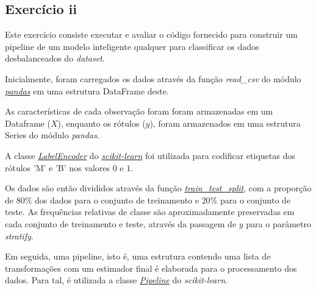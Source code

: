 

\subsection{Exercício ii}

Este exercício consiste executar e avaliar o código fornecido para construir um pipeline de um modelo inteligente qualquer para classificar os dados desbalanceados do \textit{dataset}.

Inicialmente, foram carregados os dados através da função \textit{read\_csv} do módulo \href{https://pandas.pydata.org/}{\textit{pandas}} em uma estrutura DataFrame deste.

As características de cada observação foram foram armazenadas em um Dataframe ($X$), enquanto os rótulos ($y$), foram armazenados em uma estrutura Series do módulo \textit{pandas}.

A classe \textit{\href{https://scikit-learn.org/stable/modules/generated/sklearn.preprocessing.LabelEncoder.html}{LabelEncoder}} do \href{https://scikit-learn.org/stable/index.html}{\textit{scikit-learn}} \citep{scikit-learn} foi utilizada para codificar etiquetas dos rótulos 'M' e 'B' nos valores $0$ e $1$.

Os dados são então divididos através da função \href{https://scikit-learn.org/stable/modules/generated/sklearn.model_selection.train_test_split.html}{\textit{train\_test\_split}}, com a proporção de $80\%$ dos dados para o conjunto de treinamento e $20\%$ para o conjunto de teste. As frequências relativas de classe são aproximadamente preservadas em cada conjunto de treinamento e teste, através da passagem de $y$ para o parâmetro \textit{stratify}.

Em seguida, uma pipeline, isto é, uma estrutura contendo uma lista de transformações com um estimador final é elaborada para o processamento dos dados. Para tal, é utilizada a classe \href{https://scikit-learn.org/stable/modules/generated/sklearn.pipeline.Pipeline.html#sklearn.pipeline.Pipeline}{\textit{Pipeline}} do \textit{scikit-learn}.  

